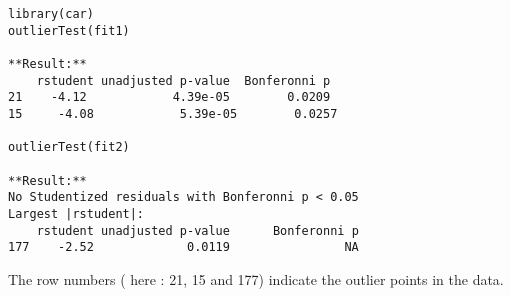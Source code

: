


\begin{verbatim}
library(car)
outlierTest(fit1)   

**Result:**
    rstudent unadjusted p-value  Bonferonni p
21    -4.12            4.39e-05        0.0209
15     -4.08            5.39e-05        0.0257

outlierTest(fit2)   

**Result:**
No Studentized residuals with Bonferonni p < 0.05
Largest |rstudent|:
    rstudent unadjusted p-value      Bonferonni p
177    -2.52             0.0119                NA
\end{verbatim}


The row numbers ( here : 21, 15 and 177) indicate the outlier points in the data.




